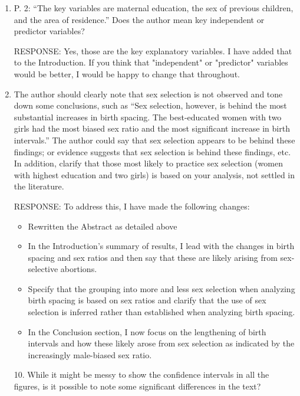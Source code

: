 \documentclass[letterpaper,12pt]{article}
\begin{document}
\begin{enumerate}[resume]
\item  P. 2: “The key variables are maternal education, the sex of previous children, and the
area of residence.” Does the author mean key independent or predictor variables?

RESPONSE: Yes, those are the key explanatory variables. 
I have added that to the Introduction.
If you think that "independent" or "predictor" variables would be better, I would
be happy to change that throughout.


\item  The author should clearly note that sex selection is not observed and tone down some
conclusions, such as “Sex selection, however, is behind the most substantial increases in
birth spacing. The best-educated women with two girls had the most biased sex ratio and the
most significant increase in birth intervals.” The author could say that sex selection
appears to be behind these findings; or evidence suggests that sex selection is behind
these findings, etc. In addition, clarify that those most likely to practice sex selection
(women with highest education and two girls) is based on your analysis, not settled in the
literature.

RESPONSE:  To address this, I have made the following changes:
\begin{itemize}
\item Rewritten the Abstract as detailed above
\item In the Introduction's summary of results, I lead with the changes in birth spacing and 
sex ratios and then say that these are likely arising from sex-selective abortions.
\item Specify that the grouping into more and less sex selection when analyzing birth spacing 
is based on sex ratios and clarify that the use of sex selection is inferred rather than 
established when analyzing birth spacing.
\item In the Conclusion section, I now focus on the lengthening of birth intervals and how
these likely arose from sex selection as indicated by the increasingly male-biased sex
ratio.
\end{itemize}

10. While it might be messy to show the confidence intervals in all the figures, is it
possible to note some significant differences in the text?


\end{enumerate}
\end{document}
